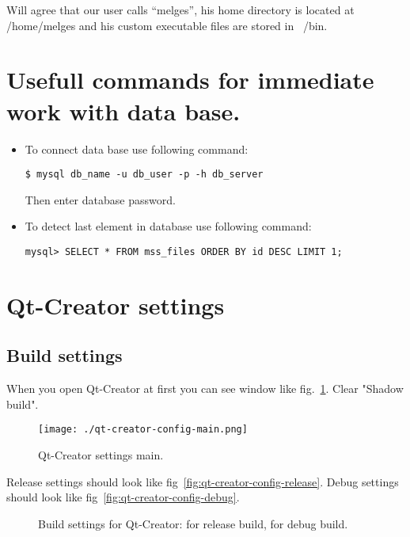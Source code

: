 Will agree that our user calls ``melges'', his home directory is located at /home/melges and his custom executable files are stored in ~/bin.

\section{Usefull commands for immediate work with data base.}

\begin{itemize}

\item To connect data base use following command:

\begin{lstlisting}
$ mysql db_name -u db_user -p -h db_server
\end{lstlisting}

Then enter database password.

\item To detect last element in database use following command:

\begin{lstlisting}
mysql> SELECT * FROM mss_files ORDER BY id DESC LIMIT 1;
\end{lstlisting}

\end{itemize}

\section{Qt-Creator settings}

\subsection{Build settings}\label{sec:qt-build}

When you open Qt-Creator at first you can see window like fig.~\ref{fig:qt-creator-config-main}. Clear "Shadow build".

\begin{figure}[htp]
  \centering
  \texttt{[image: ./qt-creator-config-main.png]}
  \caption{Qt-Creator settings main.}
  \label{fig:qt-creator-config-main}
\end{figure}

Release settings should look like fig~\ref{fig:qt-creator-config-release}. Debug settings should look like fig~\ref{fig:qt-creator-config-debug}.

\begin{figure}[htb]
  \centering
  \caption{Build settings for Qt-Creator:  for release build,  for debug build.}
\end{figure}

